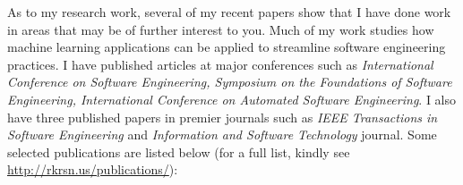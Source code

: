 \documentclass[10pt,letterpaper,sans]{moderncv}         \moderncvstyle{casual}
\begin{document}
\begin{itemize}
\end{itemize}

As to my research work, several of my recent papers show that I have done work in areas that may be of further interest to you. Much of my work studies how machine learning applications can be applied to streamline software engineering practices. 
\newpage
I have published articles at major conferences such as \textit{International Conference on Software Engineering, Symposium on the Foundations of Software Engineering, International Conference on Automated Software Engineering}. I also have three published papers in premier journals such as \textit{IEEE Transactions in Software Engineering} and \textit{Information and Software Technology} journal. Some selected publications are listed below (for a full list, kindly see \href{http://rkrsn.us/publications/}{http://rkrsn.us/publications/}):\\[0.5cm]
\end{document}
